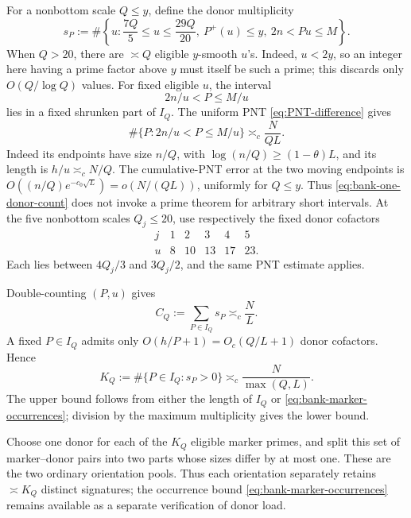 \documentclass[11pt]{article}
\numberwithin{equation}{section}
\theoremstyle{definition}
\theoremstyle{remark}
\newcommand{\1}{\mathbf 1}
\begin{document}
For a nonbottom scale \(Q\le y\), define the donor multiplicity
\begin{equation}
 s_P:=\#\left\{u:\frac{7Q}{5}\le u\le\frac{29Q}{20},\
       P^+(u)\le y,\ 2n<Pu\le M\right\}.
 \label{eq:bank-donor-multiplicity}
\end{equation}
When \(Q>20\), there are \(\asymp Q\) eligible \(y\)-smooth \(u\)'s.
Indeed, \(u<2y\), so an integer here having a prime factor above \(y\)
must itself be such a prime; this discards only \(O(Q/\log Q)\) values.
For fixed eligible \(u\), the interval
\[
                         2n/u<P\le M/u
\]
lies in a fixed shrunken part of \(I_Q\).  The uniform PNT
\eqref{eq:PNT-difference} gives
\begin{equation}
 \#\{P:2n/u<P\le M/u\}\asymp_c\frac{N}{QL}.
 \label{eq:bank-one-donor-count}
\end{equation}
Indeed its endpoints have size \(n/Q\), with
\(\log(n/Q)\ge(1-\theta)L\), and its length is
\(h/u\asymp_c N/Q\).  The cumulative-PNT error at the two moving
endpoints is
\(O((n/Q)e^{-c_0\sqrt L})=o(N/(QL))\), uniformly for \(Q\le y\).
Thus \eqref{eq:bank-one-donor-count} does not invoke a prime theorem for
arbitrary short intervals.
At the five nonbottom scales \(Q_j\le20\), use respectively the fixed
donor cofactors
\begin{equation}
\begin{array}{c|ccccc}
j&1&2&3&4&5\\ \hline
u&8&10&13&17&23.
\end{array}
\label{eq:bank-small-scale-donors}
\end{equation}
Each lies between \(4Q_j/3\) and \(3Q_j/2\), and the same PNT estimate
applies.

Double-counting \((P,u)\) gives
\begin{equation}
 C_Q:=\sum_{P\in I_Q}s_P\asymp_c\frac NL.
 \label{eq:bank-marker-occurrences}
\end{equation}
A fixed \(P\in I_Q\) admits only
\(O(h/P+1)=O_c(Q/L+1)\) donor cofactors.  Hence
\begin{equation}
 K_Q:=\#\{P\in I_Q:s_P>0\}
      \asymp_c\frac{N}{\max(Q,L)}.
 \label{eq:bank-marker-signatures}
\end{equation}
The upper bound follows from either the length of \(I_Q\) or
\eqref{eq:bank-marker-occurrences}; division by the maximum multiplicity
gives the lower bound.

Choose one donor for each of the \(K_Q\) eligible marker primes, and split
this set of marker--donor pairs into two parts whose sizes differ by at
most one.  These are the two ordinary orientation pools.  Thus each
orientation separately retains \(\asymp K_Q\) distinct signatures; the
occurrence bound \eqref{eq:bank-marker-occurrences} remains available as a
separate verification of donor load.
\end{document}
